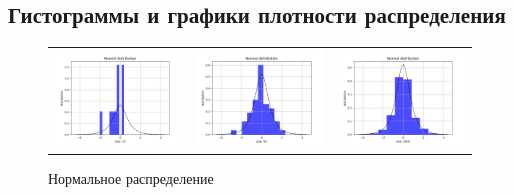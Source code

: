 \documentclass[../main.tex]{subfiles}
\begin{document}
\subsection{Гистограммы и графики плотности распределения}
	\begin{figure}[H]
		\centering
		\begin{tabular}{ccc}
			\includegraphics[width=55mm, height  =0.25\textheight]{figures/norm_10.png}
			&
			\includegraphics[width=55mm, height  =0.25\textheight]{figures/norm_50.png}
			&
			\includegraphics[width=55mm, height=0.25\textheight]{figures/norm_1000.png}
		\end{tabular}
		\caption{Нормальное распределение} 
		\label{fig:normal}
	\end{figure}
	
\end{document}
